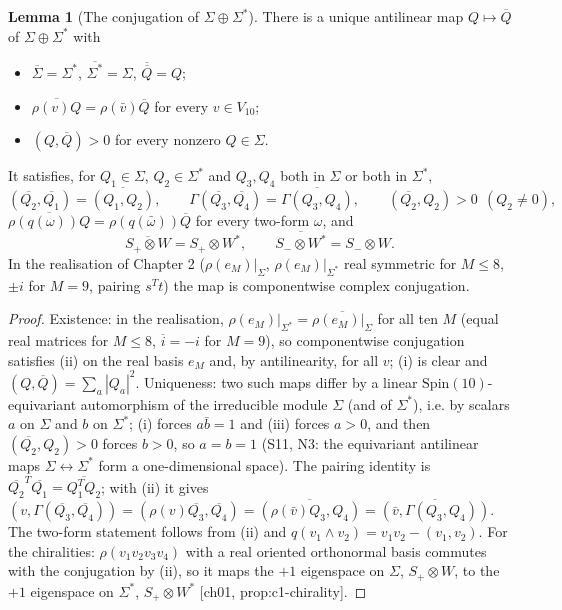 \documentclass[11pt]{article}
\theoremstyle{definition}
\newtheorem{lemma}[definition]{Lemma}
\begin{document}
\begin{lemma}[The conjugation of $\Sigma\oplus\Sigma^*$]
\label{lem:cc}
There is a unique antilinear map $Q\mapsto\overline Q$ of $\Sigma\oplus\Sigma^*$ with
\begin{itemize}
\item[(i)] $\overline{\Sigma}=\Sigma^*$, $\overline{\Sigma^*}=\Sigma$, $\overline{\overline Q}=Q$;
\item[(ii)] $\overline{\rho(v)Q}=\rho(\bar v)\overline Q$ for every $v\in V_{10}$;
\item[(iii)] $(Q,\overline Q)>0$ for every nonzero $Q\in\Sigma$.
\end{itemize}
It satisfies, for $Q_1\in\Sigma$, $Q_2\in\Sigma^*$ and $Q_3,Q_4$ both in $\Sigma$ or both in $\Sigma^*$,
\[
(\overline{Q_2},\overline{Q_1})=\overline{(Q_1,Q_2)},\qquad \Gamma(\overline{Q_3},\overline{Q_4})=\overline{\Gamma(Q_3,Q_4)},\qquad (\overline{Q_2},Q_2)>0\ \ (Q_2\neq0),
\]
$\overline{\rho(q(\omega))Q}=\rho(q(\bar\omega))\overline Q$ for every two-form $\omega$, and
\[
\overline{S_+\otimes W}=S_+\otimes W^*,\qquad \overline{S_-\otimes W^*}=S_-\otimes W .
\]
In the realisation of Chapter 2 ($\rho(e_M)|_\Sigma$, $\rho(e_M)|_{\Sigma^*}$ real symmetric for $M\le8$, $\pm i$ for $M=9$, pairing $s^Tt$) the map is componentwise complex conjugation.
\end{lemma}

\begin{proof}
Existence: in the realisation, $\rho(e_M)|_{\Sigma^*}=\overline{\rho(e_M)|_\Sigma}$ for all ten $M$ (equal real matrices for $M\le8$, $\overline{i}=-i$ for $M=9$), so componentwise conjugation satisfies (ii) on the real basis $e_M$ and, by antilinearity, for all $v$; (i) is clear and $(Q,\overline Q)=\sum_a|Q_a|^2$. Uniqueness: two such maps differ by a linear $\mathrm{Spin}(10)$-equivariant automorphism of the irreducible module $\Sigma$ (and of $\Sigma^*$), i.e. by scalars $a$ on $\Sigma$ and $b$ on $\Sigma^*$; (i) forces $a\bar b=1$ and (iii) forces $a>0$, and then $(\overline{Q_2},Q_2)>0$ forces $b>0$, so $a=b=1$ (S11, N3: the equivariant antilinear maps $\Sigma\leftrightarrow\Sigma^*$ form a one-dimensional space). The pairing identity is $\overline{Q_2}^T\overline{Q_1}=\overline{Q_1^TQ_2}$; with (ii) it gives $(v,\Gamma(\overline{Q_3},\overline{Q_4}))=(\rho(v)\overline{Q_3},\overline{Q_4})=\overline{(\rho(\bar v)Q_3,Q_4)}=\overline{(\bar v,\Gamma(Q_3,Q_4))}$. The two-form statement follows from (ii) and $q(v_1\wedge v_2)=v_1v_2-(v_1,v_2)$. For the chiralities: $\rho(v_1v_2v_3v_4)$ with a real oriented orthonormal basis commutes with the conjugation by (ii), so it maps the $+1$ eigenspace on $\Sigma$, $S_+\otimes W$, to the $+1$ eigenspace on $\Sigma^*$, $S_+\otimes W^*$ [ch01, prop:c1-chirality].
\end{proof}
\end{document}
